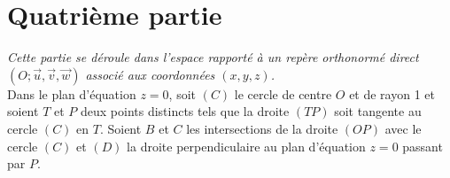 \documentclass[landscape,twocolumn,leqno,a4paper,10pt]{report} %
\newcommand\n{\noindent}
\begin{document}
\newpage

\section{Quatrième partie}

\n \textit{Cette partie se déroule dans l'espace rapporté à un repère orthonormé direct $(O ; \vec{u}, \vec{v}, \vec{w})$ associé aux coordonnées $(x, y, z)$.}\\

\n Dans le plan d'équation $z=0$, soit $(C)$ le cercle de centre $O$ et de rayon 1 et soient $T$ et $P$ deux points distincts tels que la droite $(T P)$ soit tangente au cercle $(C)$ en $T$. Soient $B$ et $C$ les intersections de la droite $(O P)$ avec le cercle $(C)$ et $(D)$ la droite perpendiculaire au plan d'équation $z = 0$ passant par $P$.
\end{document}
